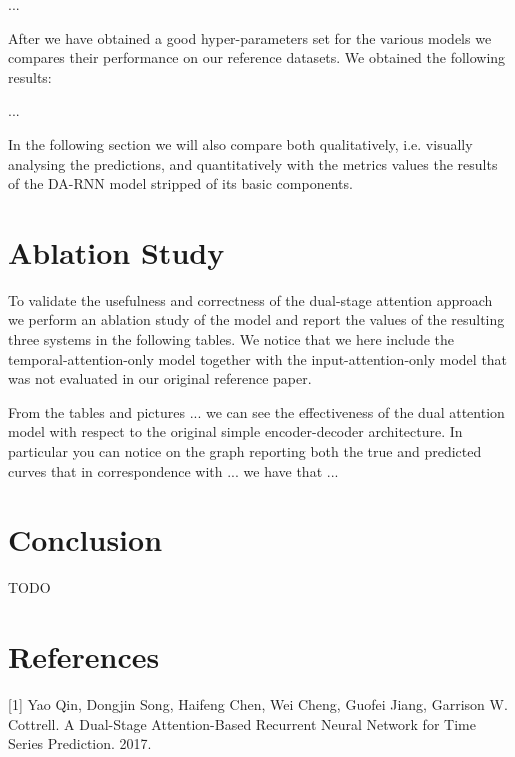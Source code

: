 \documentclass{article}
\begin{document}
...

After we have obtained a good hyper-parameters set for the various models we 
compares their performance on our reference datasets. We obtained the following 
results:

...

In the following section we will also compare both qualitatively, i.e. visually 
analysing the predictions, and quantitatively with the metrics values the results 
of the DA-RNN model stripped of its basic components.


\section{Ablation Study}

To validate the usefulness and correctness of the dual-stage attention approach we
perform an ablation study of the model and report the values of the resulting 
three systems in the following tables. We notice that we here include the 
temporal-attention-only model together with the input-attention-only model that
was not evaluated in our original reference paper.

From the tables and pictures ...
we can see the effectiveness of the dual attention model with respect to the 
original simple encoder-decoder architecture. In particular you can notice on 
the graph reporting both the true and predicted curves that in correspondence 
with ... we have that ...

\section{Conclusion}

TODO

\section*{References}

\small

[1] Yao Qin, Dongjin Song, Haifeng Chen, Wei Cheng, Guofei Jiang, Garrison W.
Cottrell. A Dual-Stage Attention-Based Recurrent Neural Network for Time Series
Prediction. 2017.
\end{document}
